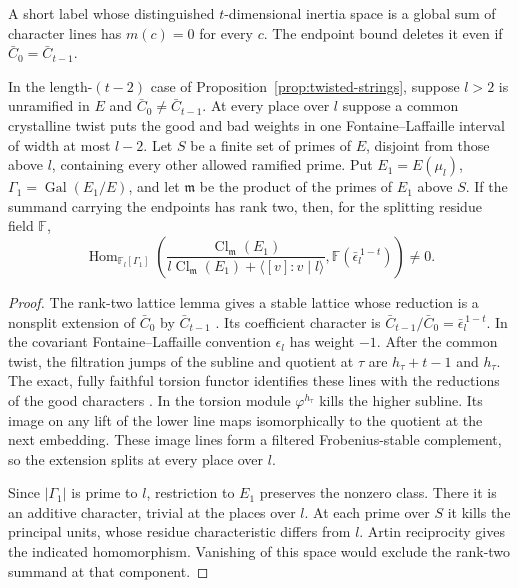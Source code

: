 A short label whose distinguished $t$-dimensional inertia space is
a global sum of character lines has $m(c)=0$ for every $c$.
The endpoint bound deletes it even if $\bar C_0=\bar C_{t-1}$.

\begin{corollary}\label{cor:twisted-ray}
In the length-$(t-2)$ case of Proposition~\ref{prop:twisted-strings},
suppose $l>2$ is unramified in $E$ and $\bar C_0\ne\bar C_{t-1}$.
At every place over $l$ suppose a common crystalline twist puts the
good and bad weights in one Fontaine--Laffaille interval of width
at most $l-2$. Let $S$ be a finite set of primes of $E$, disjoint
from those above $l$, containing every other allowed ramified prime.
Put $E_1=E(\mu_l)$, $\Gamma_1=\operatorname{Gal}(E_1/E)$, and let
$\mathfrak m$ be the product of the primes of $E_1$ above $S$.
If the summand carrying the endpoints has rank two, then, for the
splitting residue field $\mathbb F$,
\[
 \operatorname{Hom}_{\mathbb F_l[\Gamma_1]}\!\left(
 \frac{\operatorname{Cl}_{\mathfrak m}(E_1)}
 {l\operatorname{Cl}_{\mathfrak m}(E_1)+\langle[v]:v\mid l\rangle},
 \mathbb F(\bar\epsilon_l^{\,1-t})\right)\ne0 .
\]
\end{corollary}

\begin{proof}
The rank-two lattice lemma gives a stable lattice whose reduction
is a nonsplit extension of $\bar C_0$ by $\bar C_{t-1}$
\citep[Theorem~1]{bellaiche-ribet}. Its coefficient character is
$\bar C_{t-1}/\bar C_0=\bar\epsilon_l^{\,1-t}$.
In the covariant Fontaine--Laffaille convention
$\epsilon_l$ has weight $-1$. After the common twist, the filtration
jumps of the subline and quotient at $\tau$ are $h_\tau+t-1$ and
$h_\tau$. The exact, fully faithful torsion functor identifies
these lines with the reductions of the good characters
\citep[Fact~4.10 and Remark~4.11]{booher-fl}. In the torsion module
$\varphi^{h_\tau}$ kills the higher subline. Its image on any lift of
the lower line maps isomorphically to the quotient at the next
embedding. These image lines form a filtered Frobenius-stable
complement, so the extension splits at every place over $l$.

Since $|\Gamma_1|$ is prime to $l$, restriction to $E_1$ preserves
the nonzero class. There it is an additive character, trivial at
the places over $l$. At each prime over $S$ it kills the principal
units, whose residue characteristic differs from $l$. Artin
reciprocity gives the indicated homomorphism. Vanishing of this
space would exclude the rank-two summand at that component.
\end{proof}

